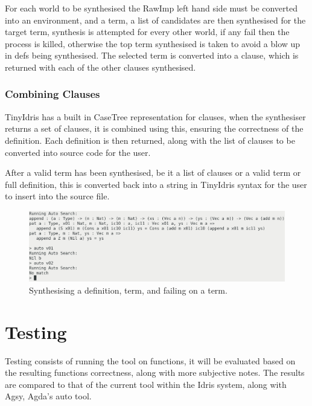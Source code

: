 \documentclass[a4paper]{article}
\begin{document}
For each world to be synthesised the RawImp left hand side must be 
converted into an environment, and a term, a list of candidates are then 
synthesised for the target term, synthesis is attempted for every other world, 
if any fail then the process is killed, otherwise the top term synthesised
is taken to avoid a blow up in defs being synthesised. The selected term is
converted into a clause, which is returned with each of the other clauses synthesised. 

\subsubsection{Combining Clauses}
\label{sec:orgbc7bb36}
TinyIdris has a built in CaseTree representation for clauses, when the synthesiser
returns a set of clauses, it is combined using this, ensuring the correctness
of the definition. Each definition is then returned, along with the list of clauses
to be converted into source code for the user. 

After a valid term has been synthesised, be it a list of clauses or a valid term or 
full definition, this is converted back into a string in TinyIdris syntax for
the user to insert into the source file. 

\begin{center}
\begin{figure}[htbp]
\centering
\includegraphics[scale=0.25]{./Resource/running.png}
\caption{Synthesising a definition, term, and failing on a term.}
\end{figure}
\end{center}

\section{Testing}
\label{sec:org63310e0}

Testing consists of running the tool on functions, 
it will be evaluated based on the resulting functions 
correctness, along with more subjective notes. The results
are compared to that of the current tool within the Idris 
system, along with Agsy, Agda's auto tool.
\end{document}
